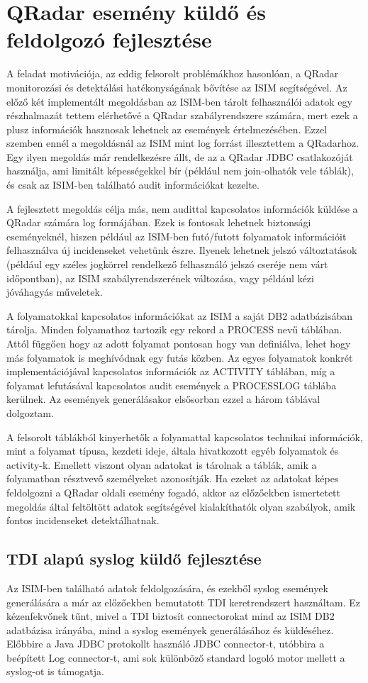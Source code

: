 \section{QRadar esemény küldő és feldolgozó fejlesztése}
A feladat motivációja, az eddig felsorolt problémákhoz hasonlóan, a QRadar monitorozási és detektálási hatékonyságának bővítése az ISIM segítségével. Az előző két implementált megoldásban az ISIM-ben tárolt felhasználói adatok egy részhalmazát tettem elérhetővé a QRadar szabályrendszere számára, mert ezek a plusz információk hasznosak lehetnek az események értelmezésében. Ezzel szemben ennél a megoldásnál az ISIM mint log forrást illesztettem a QRadarhoz. Egy ilyen megoldás már rendelkezésre állt, de az a QRadar JDBC csatlakozóját használja, ami limitált képességekkel bír (például nem join-olhatók vele táblák), és csak az ISIM-ben található audit információkat kezelte.

A fejlesztett megoldás célja más, nem audittal kapcsolatos információk küldése a QRadar számára log formájában. Ezek is fontosak lehetnek biztonsági eseményeknél, hiszen például az ISIM-ben futó/futott folyamatok információit felhasználva új incidenseket vehetünk észre. Ilyenek lehetnek jelszó változtatások (például egy széles jogkörrel rendelkező felhasználó jelszó cseréje nem várt időpontban), az ISIM szabályrendszerének változása, vagy például kézi jóváhagyás műveletek. 

A folyamatokkal kapcsolatos információkat az ISIM a saját DB2 adatbázisában tárolja. Minden folyamathoz tartozik egy rekord a PROCESS nevű táblában. Attól függően hogy az adott folyamat pontosan hogy van definiálva, lehet hogy más folyamatok is meghívódnak egy futás közben. Az egyes folyamatok konkrét implementációjával kapcsolatos információk az ACTIVITY táblában, míg a folyamat lefutásával kapcsolatos audit események a PROCESSLOG táblába kerülnek. Az események generálásakor elsősorban ezzel a három táblával dolgoztam.

A felsorolt táblákból kinyerhetők a folyamattal kapcsolatos technikai információk, mint a folyamat típusa, kezdeti ideje, általa hivatkozott egyéb folyamatok és activity-k. Emellett viszont olyan adatokat is tárolnak a táblák, amik a folyamatban résztvevő személyeket azonosítják. Ha ezeket az adatokat képes feldolgozni a QRadar oldali esemény fogadó, akkor az előzőekben ismertetett megoldás által feltöltött adatok segítségével kialakíthatók olyan szabályok, amik fontos incidenseket detektálhatnak.
 
\subsection{TDI alapú syslog küldő fejlesztése}
Az ISIM-ben található adatok feldolgozására, és ezekből syslog események generálására a már az előzőekben bemutatott TDI keretrendszert használtam. Ez kézenfekvőnek tűnt, mivel a TDI biztosít connectorokat mind az ISIM DB2 adatbázisa irányába, mind a syslog események generálásához és küldéséhez. Előbbire a Java JDBC protokollt használó JDBC connector-t, utóbbira a beépített Log connector-t, ami sok különböző standard logoló motor mellett a syslog-ot is támogatja. 

